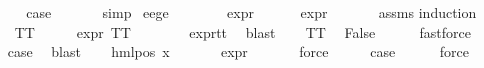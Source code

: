 \begin{isabellebody}
\ \ \isamarkupfalse%
\ \isamarkupfalse%
\ {\isacharquery}{\kern0pt}case\ \isanewline
\ \ \ \ \isamarkupfalse%
\ simp\isanewline
{}\isamarkupfalse%
%
\endisatagproof
{\isafoldproof}%
%
\isadelimproof
\isanewline
%
\endisadelimproof
\isanewline
{}\isamarkupfalse%
\ e{}{\isacharunderscore}{\kern0pt}e{}{\isacharunderscore}{\kern0pt}ge{\isacharunderscore}{\kern0pt}{}{\isacharcolon}{\kern0pt}\ \isanewline
\ \ \ {\isasymphi}\isanewline
\ \ \ {\isachardoublequoteopen}expr{\isacharunderscore}{\kern0pt}{}\ {\isasymphi}\ {\isasymge}\ {}{\isachardoublequoteclose}\isanewline
\ \ \ {\isachardoublequoteopen}expr{\isacharunderscore}{\kern0pt}{}\ {\isasymphi}\ {\isasymge}\ {}{\isachardoublequoteclose}\isanewline
%
\isadelimproof
\ \ %
\endisadelimproof
%
\isatagproof
{}\isamarkupfalse%
\ assms\isanewline
{}\isamarkupfalse%
{\isacharparenleft}{\kern0pt}induction\ {\isasymphi}{\isacharparenright}{\kern0pt}\isanewline
\ \ \isamarkupfalse%
\ TT\isanewline
\ \ \isamarkupfalse%
\ \isamarkupfalse%
\ {\isachardoublequoteopen}expr{\isacharunderscore}{\kern0pt}{}\ TT\ {\isacharequal}{\kern0pt}\ {}{\isachardoublequoteclose}\isanewline
\ \ \ \ \isamarkupfalse%
\ expr{\isacharunderscore}{\kern0pt}{}{\isacharunderscore}{\kern0pt}tt\ \isamarkupfalse%
\ blast\isanewline
\ \ \isamarkupfalse%
\ TT\ \isamarkupfalse%
\ False\isanewline
\ \ \ \ \isamarkupfalse%
\ fastforce\isanewline
\ \ \isamarkupfalse%
\ \isamarkupfalse%
\ {\isacharquery}{\kern0pt}case\ \isamarkupfalse%
\ blast\isanewline
{}\isamarkupfalse%
\isanewline
\ \ \isamarkupfalse%
\ {\isacharparenleft}{\kern0pt}hml{\isacharunderscore}{\kern0pt}pos\ x{}\ {\isasymphi}{\isacharparenright}{\kern0pt}\isanewline
\ \ \isamarkupfalse%
\ {\isachardoublequoteopen}{}\ {\isasymle}\ expr{\isacharunderscore}{\kern0pt}{}\ {\isasymphi}{\isachardoublequoteclose}\isanewline
\ \ \ \ \isamarkupfalse%
\ force\isanewline
\ \ \isamarkupfalse%
\ \isamarkupfalse%
\ {\isacharquery}{\kern0pt}case\isanewline
\ \ \ \ \isamarkupfalse%
\ force\isanewline

\end{isabellebody}
